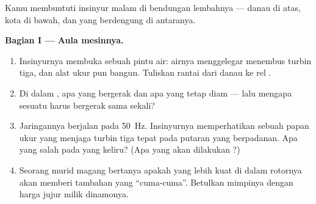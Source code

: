 \begin{problem}\label{pb:g9:alternator:1}
Kamu membuntuti insinyur malam di bendungan lembahnya --- danau di
atas, kota di bawah, dan  yang berdengung di antaranya.

\medskip\noindent\textbf{Bagian I --- Aula mesinnya.}
\begin{enumerate}
  \item Insinyurnya membuka sebuah pintu air: airnya menggelegar
        menembus turbin tiga, dan alat ukur  pun bangun.
        Tuliskan rantai  dari danau ke rel .
  \item Di dalam , apa yang bergerak dan apa yang tetap
        diam --- lalu mengapa sesuatu harus bergerak sama sekali?
  \item Jaringannya berjalan pada \qty{50}{Hz}. Insinyurnya
        memperhatikan sebuah papan ukur yang menjaga turbin tiga tepat
        pada putaran yang berpadanan. Apa yang salah pada 
        yang keliru? (Apa yang akan dilakukan  ?)
  \item Seorang murid magang bertanya apakah  yang lebih kuat di
        dalam rotornya akan memberi  tambahan yang ``cuma-cuma''.
        Betulkan mimpinya dengan harga jujur milik dinamonya.
\end{enumerate}


\end{problem}
